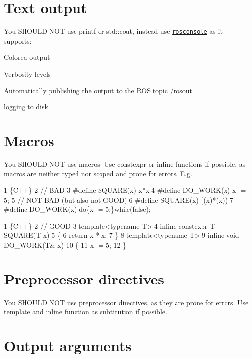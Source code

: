 \section*{Text output}

You S\+H\+O\+U\+LD N\+OT use {\ttfamily printf} or {\ttfamily std\+::cout}, instead use \href{http://wiki.ros.org/rosconsole}{\tt rosconsole} as it supports\+:


\begin{DoxyItemize}
\item Colored output
\item Verbosity levels
\item Automatically publishing the output to the R\+OS topic {\ttfamily /rosout}
\item logging to disk
\end{DoxyItemize}

\section*{Macros}

You S\+H\+O\+U\+LD N\+OT use macros. Use {\ttfamily constexpr} or {\ttfamily inline} functions if possible, as macros are neither typed nor scoped and prone for errors. E.\+g. 
\begin{DoxyCode}
1 \{C++\}
2 // BAD
3 #define SQUARE(x) x*x
4 #define DO\_WORK(x) x -= 5;
5 // NOT BAD (but also not GOOD)
6 #define SQUARE(x) ((x)*(x))
7 #define DO\_WORK(x) do\{x -= 5;\}while(false);
\end{DoxyCode}
 
\begin{DoxyCode}
1 \{C++\}
2 // GOOD
3 template<typename T>
4 inline constexpr T SQUARE(T x)
5 \{
6     return x * x;
7 \}
8 template<typename T>
9 inline void DO\_WORK(T& x)
10 \{
11     x -= 5;
12 \}
\end{DoxyCode}


\section*{Preprocessor directives}

You S\+H\+O\+U\+LD N\+OT use preprocessor directives, as they are prone for errors. Use {\ttfamily template} and {\ttfamily inline} function as subtitution if possible.

\section*{Output arguments}


